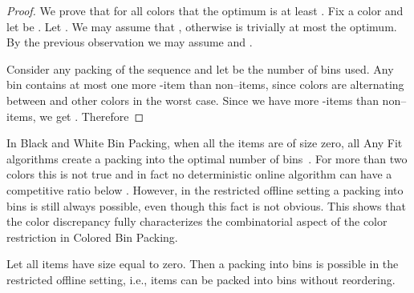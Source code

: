 \documentclass[11pt,a4paper]{article}
\begin{document}
\begin{proof}
We prove that for all colors  that the optimum is at least .
Fix a color  and let  be .
Let . We may assume that , otherwise  is trivially at most the optimum.
By the previous observation we may assume  and .

Consider any packing of the sequence and let  be the number of bins used.
Any bin contains at most one more -item than non--items,
since colors are alternating between  and other colors in the worst case.
Since we have  more -items than non--items, we get .
Therefore 
\end{proof}

In Black and White Bin Packing, when all the items are of size zero,
all Any Fit algorithms create a packing into the optimal number of
bins~\cite{balogh14}.  For more than two colors this is not true and
in fact no deterministic online algorithm can have a competitive ratio
below .  However, in the restricted offline setting a packing
into  bins is still always possible, even though this fact
is not obvious. This shows that the color discrepancy fully characterizes the
combinatorial aspect of the color restriction in Colored Bin Packing.

\begin{theorem}
\label{thm:LB2feasible}
Let all items have size equal to zero.
Then a packing into  bins is possible in the restricted offline setting,
i.e., items can be packed into  bins without reordering.
\end{theorem}
\end{document}
